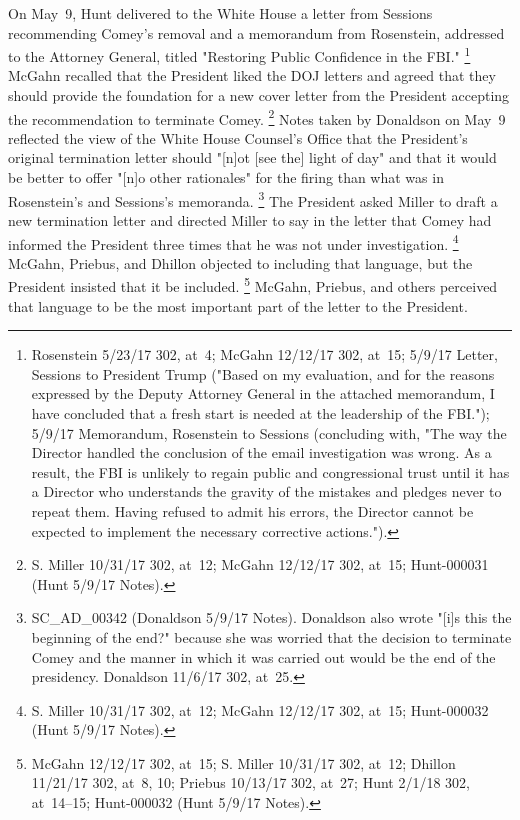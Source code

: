 On May~9, Hunt delivered to the White House a letter from Sessions recommending Comey's removal and a memorandum from Rosenstein, addressed to the Attorney General, titled "Restoring Public Confidence in the FBI."%
\footnote{Rosenstein 5/23/17 302, at~4;
McGahn 12/12/17 302, at~15;
5/9/17 Letter, Sessions to President Trump ("Based on my evaluation, and for the reasons expressed by the Deputy Attorney General in the attached memorandum, I have concluded that a fresh start is needed at the leadership of the FBI.");
5/9/17 Memorandum, Rosenstein to Sessions (concluding with, "The way the Director handled the conclusion of the email investigation was wrong.
As a result, the FBI is unlikely to regain public and congressional trust until it has a Director who understands the gravity of the mistakes and pledges never to repeat them.
Having refused to admit his errors, the Director cannot be expected to implement the necessary corrective actions.").}
McGahn recalled that the President liked the DOJ letters and agreed that they should provide the foundation for a new cover letter from the President accepting the recommendation to terminate Comey.%
\footnote{S. Miller 10/31/17 302, at~12;
McGahn 12/12/17 302, at~15;
Hunt-000031 (Hunt 5/9/17 Notes).}
Notes taken by Donaldson on May~9 reflected the view of the White House Counsel's Office that the President's original termination letter should "[n]ot [see the] light of day" and that it would be better to offer "[n]o other rationales" for the firing than what was in Rosenstein's and Sessions's memoranda.%
\footnote{SC\_AD\_00342 (Donaldson 5/9/17 Notes).
Donaldson also wrote "[i]s this the beginning of the end?" because she was worried that the decision to terminate Comey and the manner in which it was carried out would be the end of the presidency.
Donaldson 11/6/17 302, at~25.}
The President asked Miller to draft a new termination letter and directed Miller to say in the letter that Comey had informed the President three times that he was not under investigation.%
\footnote{S. Miller 10/31/17 302, at~12;
McGahn 12/12/17 302, at~15;
Hunt-000032 (Hunt 5/9/17 Notes).}
McGahn, Priebus, and Dhillon objected to including that language, but the President insisted that it be included.%
\footnote{McGahn 12/12/17 302, at~15;
S. Miller 10/31/17 302, at~12;
Dhillon 11/21/17 302, at~8, 10;
Priebus 10/13/17 302, at~27;
Hunt 2/1/18 302, at~14--15;
Hunt-000032 (Hunt 5/9/17 Notes).}
McGahn, Priebus, and others perceived that language to be the most important part of the letter to the President.%
